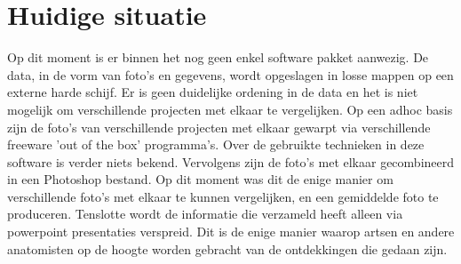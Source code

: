 \section{Huidige situatie}
\label{huidigesituatie}
Op dit moment is er binnen het \casamproject nog geen enkel software pakket aanwezig.
De data, in de vorm van foto's en gegevens, wordt opgeslagen in losse mappen op een externe harde schijf. 
Er is geen duidelijke ordening in de data en het is niet mogelijk om verschillende projecten met elkaar te vergelijken.
Op een adhoc basis zijn de foto's van verschillende projecten met elkaar gewarpt via verschillende freeware 'out of the box' programma's. 
Over de gebruikte technieken in deze software is verder niets bekend. 
Vervolgens zijn de foto's met elkaar gecombineerd in een Photoshop bestand. Op dit moment was dit de enige manier om verschillende foto's met elkaar te kunnen vergelijken, en een gemiddelde foto te produceren.
Tenslotte wordt de informatie die \casam verzameld heeft alleen via powerpoint presentaties verspreid. 
Dit is de enige manier waarop artsen en andere anatomisten op de hoogte worden gebracht van de ontdekkingen die gedaan zijn.
